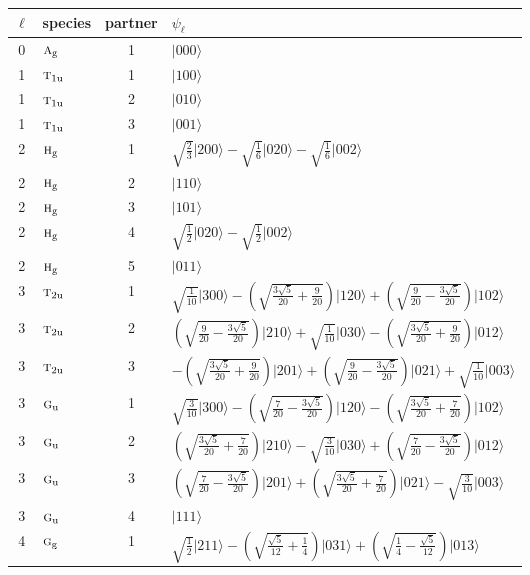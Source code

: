 \documentclass[11pt]{article}
\newcommand{\irr}[1]{\text{\normalfont\scshape #1}}
\newcommand{\ptag}[1]{\mathrm{#1}}
\newcommand{\occ}[1]{\lvert #1\rangle}
\begin{document}
\begin{longtable}{c l c p{}}\hline $\ell$ & species & partner & $\psi_\ell$\\ \hline\endhead
0 & $\irr{a}_{\ptag{g}}$ & 1 & $\occ{000}$\\
\hline
1 & $\irr{t}_{1\ptag{u}}$ & 1 & $\occ{100}$\\
1 & $\irr{t}_{1\ptag{u}}$ & 2 & $\occ{010}$\\
1 & $\irr{t}_{1\ptag{u}}$ & 3 & $\occ{001}$\\
\hline
2 & $\irr{h}_{\ptag{g}}$ & 1 & $\sqrt{\tfrac{2}{3}}\occ{200}-\sqrt{\tfrac{1}{6}}\occ{020}-\sqrt{\tfrac{1}{6}}\occ{002}$\\
2 & $\irr{h}_{\ptag{g}}$ & 2 & $\occ{110}$\\
2 & $\irr{h}_{\ptag{g}}$ & 3 & $\occ{101}$\\
2 & $\irr{h}_{\ptag{g}}$ & 4 & $\sqrt{\tfrac{1}{2}}\occ{020}-\sqrt{\tfrac{1}{2}}\occ{002}$\\
2 & $\irr{h}_{\ptag{g}}$ & 5 & $\occ{011}$\\
\hline
3 & $\irr{t}_{2\ptag{u}}$ & 1 & $\sqrt{\tfrac{1}{10}}\occ{300}-(\sqrt{\frac{3 \sqrt{5}}{20} + \frac{9}{20}})\occ{120}+(\sqrt{\frac{9}{20} - \frac{3 \sqrt{5}}{20}})\occ{102}$\\
3 & $\irr{t}_{2\ptag{u}}$ & 2 & $(\sqrt{\frac{9}{20} - \frac{3 \sqrt{5}}{20}})\occ{210}+\sqrt{\tfrac{1}{10}}\occ{030}-(\sqrt{\frac{3 \sqrt{5}}{20} + \frac{9}{20}})\occ{012}$\\
3 & $\irr{t}_{2\ptag{u}}$ & 3 & $-(\sqrt{\frac{3 \sqrt{5}}{20} + \frac{9}{20}})\occ{201}+(\sqrt{\frac{9}{20} - \frac{3 \sqrt{5}}{20}})\occ{021}+\sqrt{\tfrac{1}{10}}\occ{003}$\\
3 & $\irr{g}_{\ptag{u}}$ & 1 & $\sqrt{\tfrac{3}{10}}\occ{300}-(\sqrt{\frac{7}{20} - \frac{3 \sqrt{5}}{20}})\occ{120}-(\sqrt{\frac{3 \sqrt{5}}{20} + \frac{7}{20}})\occ{102}$\\
3 & $\irr{g}_{\ptag{u}}$ & 2 & $(\sqrt{\frac{3 \sqrt{5}}{20} + \frac{7}{20}})\occ{210}-\sqrt{\tfrac{3}{10}}\occ{030}+(\sqrt{\frac{7}{20} - \frac{3 \sqrt{5}}{20}})\occ{012}$\\
3 & $\irr{g}_{\ptag{u}}$ & 3 & $(\sqrt{\frac{7}{20} - \frac{3 \sqrt{5}}{20}})\occ{201}+(\sqrt{\frac{3 \sqrt{5}}{20} + \frac{7}{20}})\occ{021}-\sqrt{\tfrac{3}{10}}\occ{003}$\\
3 & $\irr{g}_{\ptag{u}}$ & 4 & $\occ{111}$\\
\hline
4 & $\irr{g}_{\ptag{g}}$ & 1 & $\sqrt{\tfrac{1}{2}}\occ{211}-(\sqrt{\frac{\sqrt{5}}{12} + \frac{1}{4}})\occ{031}+(\sqrt{\frac{1}{4} - \frac{\sqrt{5}}{12}})\occ{013}$\\

\end{longtable}
\end{document}
